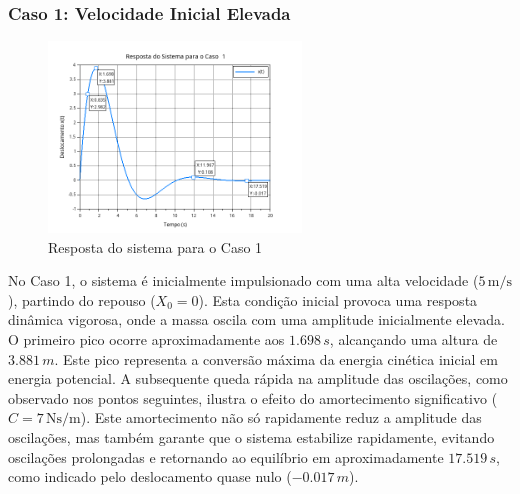 \subsubsection{Caso 1: Velocidade Inicial Elevada}
\begin{figure}[H]
    \centering
    \includegraphics[width=0.6\textwidth]{atividades/1-atividade/assets/caso1.png}
    \caption{Resposta do sistema para o Caso 1}
\end{figure}
No Caso 1, o sistema é inicialmente impulsionado com uma alta velocidade (\(5 \, \text{m/s}\)), partindo do repouso (\(X_0 = 0\)). Esta condição inicial provoca uma resposta dinâmica vigorosa, onde a massa oscila com uma amplitude inicialmente elevada. O primeiro pico ocorre aproximadamente aos \(1.698 \, s\), alcançando uma altura de \(3.881 \, m\). Este pico representa a conversão máxima da energia cinética inicial em energia potencial. A subsequente queda rápida na amplitude das oscilações, como observado nos pontos seguintes, ilustra o efeito do amortecimento significativo (\(C = 7 \, \text{Ns/m}\)). Este amortecimento não só rapidamente reduz a amplitude das oscilações, mas também garante que o sistema estabilize rapidamente, evitando oscilações prolongadas e retornando ao equilíbrio em aproximadamente \(17.519 \, s\), como indicado pelo deslocamento quase nulo (\(-0.017 \, m\)).

